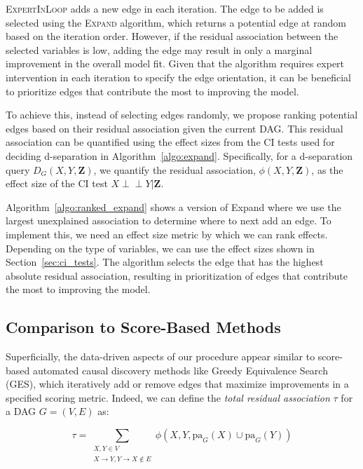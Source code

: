 \documentclass[accepted]{uai2025} %
\def\ci{\perp\!\!\!\!\perp}
\begin{document}
\textsc{ExpertInLoop} adds a new edge in each iteration. The edge
to be added is selected using the \textsc{Expand} algorithm, which 
returns a potential edge at random based on the iteration order. 
However, if the residual association between the selected variables 
is low, adding the edge may result in only a marginal improvement 
in the overall model fit. Given that the
algorithm requires expert intervention in each iteration to specify the edge
orientation, it can be beneficial to prioritize edges that contribute 
the most to improving the model.

To achieve this, instead of selecting edges randomly, we propose ranking
potential edges based on their residual association given the current DAG. This
residual association can be quantified using the effect sizes from the
CI tests used for deciding d-separation in Algorithm~\ref{algo:expand}.
Specifically, for a d-separation query $D_G(X, Y, \mathbf{Z}) $, we quantify
the residual association, $ \phi(X, Y, \bm{Z}) $, as the effect size of the CI
test $X \ci Y \rvert \bm{Z} $. 

Algorithm~\ref{algo:ranked_expand} shows a 
version of {\sc Expand} where we use the largest unexplained association to
determine where to next add an edge. 
To implement this, we need an effect size
metric by which we can rank effects. Depending on the type of variables, 
we can use the effect sizes shown in Section~\ref{sec:ci_tests}. 
The algorithm selects the edge that has the highest absolute residual 
association, resulting
in prioritization of edges that contribute the most to improving the model.

\subsection{Comparison to Score-Based Methods}

Superficially, the data-driven aspects of our procedure appear
 similar to score-based automated causal discovery methods like 
Greedy Equivalence Search (GES), which 
iteratively add or remove edges that maximize improvements in a specified
scoring metric. Indeed, we can define the \emph{total residual association}
 $ \tau $ for a DAG $ G = (V, E) $ as:

\begin{equation}
	\tau = \sum_{\substack{X, Y \in V \\ X \rightarrow Y, Y \rightarrow X \not \in E}}   \phi(X, Y, \mathrm{pa}_G(X) \cup \mathrm{pa}_G(Y))
\label{eqn:tau}
\end{equation}
\end{document}
